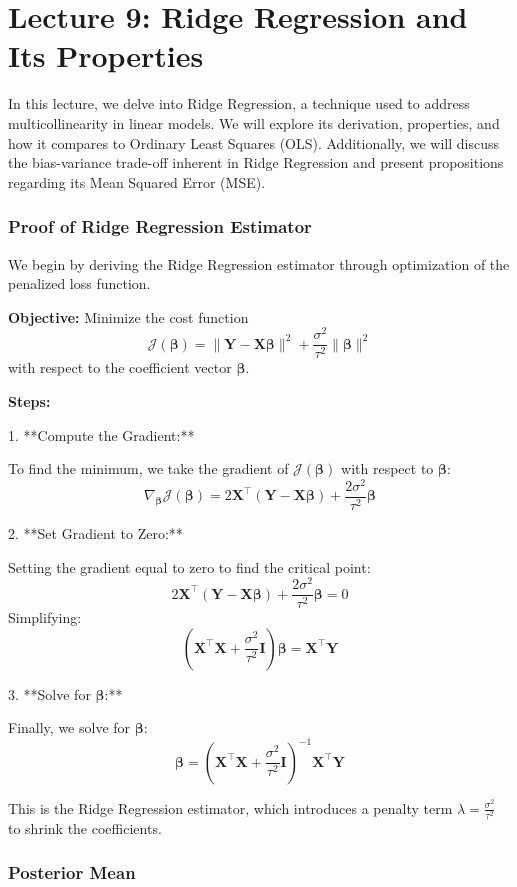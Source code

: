 \documentclass[open=any, 11pt,paper=A4]{scrreprt}
\begin{document}
\chapter{Lecture 9: Ridge Regression and Its Properties}

In this lecture, we delve into Ridge Regression, a technique used to address multicollinearity in linear models. We will explore its derivation, properties, and how it compares to Ordinary Least Squares (OLS). Additionally, we will discuss the bias-variance trade-off inherent in Ridge Regression and present propositions regarding its Mean Squared Error (MSE).

\subsection*{Proof of Ridge Regression Estimator}

We begin by deriving the Ridge Regression estimator through optimization of the penalized loss function.

\textbf{Objective:} Minimize the cost function 
\[
\mathcal{J}(\bm{\beta}) = \|\bm{Y} - \bm{X} \bm{\beta}\|^2 + \frac{\sigma^2}{\tau^2} \|\bm{\beta}\|^2
\]
with respect to the coefficient vector \(\bm{\beta}\).

\textbf{Steps:}

1. **Compute the Gradient:**

   To find the minimum, we take the gradient of \(\mathcal{J}(\bm{\beta})\) with respect to \(\bm{\beta}\):
   \[
   \nabla_{\bm{\beta}} \mathcal{J}(\bm{\beta}) = 2 \bm{X}^\top (\bm{Y} - \bm{X} \bm{\beta}) + \frac{2\sigma^2}{\tau^2} \bm{\beta}
   \]

2. **Set Gradient to Zero:**

   Setting the gradient equal to zero to find the critical point:
   \[
   2 \bm{X}^\top (\bm{Y} - \bm{X} \bm{\beta}) + \frac{2\sigma^2}{\tau^2} \bm{\beta} = 0
   \]
   Simplifying:
   \[
   (\bm{X}^\top \bm{X} + \frac{\sigma^2}{\tau^2} \bm{I}) \bm{\beta} = \bm{X}^\top \bm{Y}
   \]

3. **Solve for \(\bm{\beta}\):**

   Finally, we solve for \(\bm{\beta}\):
   \[
   \bm{\beta} = (\bm{X}^\top \bm{X} + \frac{\sigma^2}{\tau^2} \bm{I})^{-1} \bm{X}^\top \bm{Y}
   \]
   
   This is the Ridge Regression estimator, which introduces a penalty term \(\lambda = \frac{\sigma^2}{\tau^2}\) to shrink the coefficients.

\subsection*{Posterior Mean}
\end{document}
